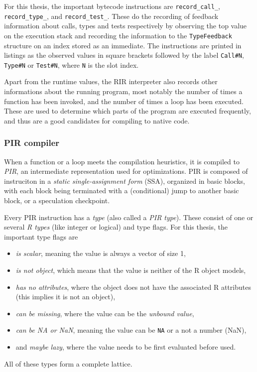 For this thesis, the important bytecode instructions are \texttt{record\_call\_}, \texttt{record\_type\_}, and \texttt{record\_test\_}. These do the recording of feedback information about calls, types and tests respectively by observing the top value on the execution stack and recording the information to the \texttt{TypeFeedback} structure on an index stored as an immediate. The instructions are printed in listings as the observed values in square brackets followed by the label \texttt{Call\#N}, \texttt{Type\#N} or \texttt{Test\#N}, where \texttt{N} is the slot index.

Apart from the runtime values, the RIR interpreter also records other informations about the running program, most notably the number of times a function has been invoked, and the number of times a loop has been executed. These are used to determine which parts of the program are executed frequently, and thus are a good candidates for compiling to native code.

\subsubsection*{PIR compiler}
When a function or a loop meets the compilation heuristics, it is compiled to \textit{PIR}, an intermediate representation used for optimizations. PIR is composed of instruciton in a \textit{static single-assignment form} (SSA), organized in basic blocks, with each block being terminated with a (conditional) jump to another basic block, or a speculation checkpoint.

Every PIR instruction has a \textit{type} (also called a \textit{PIR type}). These consist of one or several \textit{R types} (like integer or logical) and type flags. For this thesis, the important type flags are
\begin{itemize}
	\item{} \textit{is scalar}, meaning the value is always a vector of size 1,
	\item{} \textit{is not object}, which means that the value is neither of the R object models,
	\item{} \textit{has no attributes}, where the object does not have the associated R attributes (this implies it is not an object),
	\item{} \textit{can be missing}, where the value can be the \textit{unbound value},
	\item{} \textit{can be NA or NaN}, meaning the value can be \texttt{NA} or a not a number (NaN),
	\item{} and \textit{maybe lazy}, where the value needs to be first evaluated before used.
\end{itemize}
All of these types form a complete lattice.


